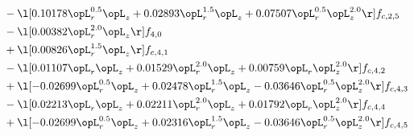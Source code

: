 \begin{alignat}{2}
& - \l[  0.10178 \opL_r^{0.5} \opL_z +  0.02893 \opL_r^{1.5} \opL_z +  0.07507 \opL_r^{0.5} \opL_z^{2.0}  \r] f_{c,2,5} \nonumber \\ 
& - \l[  0.00382 \opL_r^{2.0} \opL_z  \r] f_{4,0} \nonumber \\ 
& + \l[  0.00826 \opL_r^{1.5} \opL_z  \r] f_{c,4,1} \nonumber \\ 
& - \l[  0.01107 \opL_r \opL_z +  0.01529 \opL_r^{2.0} \opL_z +  0.00759 \opL_r \opL_z^{2.0}  \r] f_{c,4,2} \nonumber \\ 
& + \l[  -0.02699 \opL_r^{0.5} \opL_z +  0.02478 \opL_r^{1.5} \opL_z   -0.03646 \opL_r^{0.5} \opL_z^{2.0}  \r] f_{c,4,3} \nonumber \\ 
& - \l[  0.02213 \opL_r \opL_z +  0.02211 \opL_r^{2.0} \opL_z +  0.01792 \opL_r \opL_z^{2.0}  \r] f_{c,4,4} \nonumber \\ 
& + \l[  -0.02699 \opL_r^{0.5} \opL_z +  0.02316 \opL_r^{1.5} \opL_z   -0.03646 \opL_r^{0.5} \opL_z^{2.0}  \r] f_{c,4,5} \nonumber \\ 
\end{alignat} 


